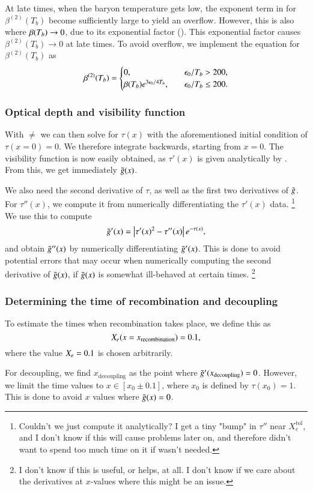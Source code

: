 At late times, when the baryon temperature gets low, the exponent term in  for $\beta^{(2)}(T_b)$ become sufficiently large to yield an overflow. However, this is also where $\beta(T_b)\to0$, due to its exponential factor (). This exponential factor causes $\beta^{(2)}(T_b)\to0$ at late times. To avoid overflow, we implement the equation for $\beta^{(2)}(T_b)$ as 
\begin{equation}
    \beta^{(2)}(T_b) = \begin{cases}
        0,\quad &\epsilon_0/T_b > 200, \\
        \beta(T_b) e^{3\epsilon_0/4T_b},\quad &\epsilon_0/T_b \leq 200.
    \end{cases}
\end{equation} 
 

\subsubsection{Optical depth and visibility function} \label{sssec:M2:implementations:optical_depth}
With $\ne$ we can then solve  for $\tau(x)$ with the aforementioned initial condition of $\tau(x=0)=0$. We therefore integrate backwards, starting from $x=0$. The visibility function is now easily obtained, as $\tau'(x)$ is given analytically by . From this, we get immediately $\tilde{g}(x)$. 

We also need the second derivative of $\tau$, as well as the first two derivatives of $\tilde{g}$. For $\tau''(x)$, we compute it from numerically differentiating the $\tau'(x)$ data. \footnote{Couldn't we just compute it analytically? I get a tiny "bump" in $\tau''$ near $X_e^\mathrm{tol}$, and I don't know if this will cause problems later on, and therefore didn't want to spend too much time on it if wasn't needed.} We use this to compute 
\begin{equation} \label{eq:M2:implementations:dg_dx}
    \tilde{g}'(x) = \left| \tau'(x)^2 - \tau''(x) \right| e^{-\tau(x)}, 
\end{equation}
and obtain $\tilde{g}''(x)$ by numerically differentiating $\tilde{g}'(x)$. This is done to avoid potential errors that may occur when numerically computing the second derivative of $\tilde{g}(x)$, if $\tilde{g}(x)$ is somewhat ill-behaved at certain times. \footnote{I don't know if this is useful, or helps, at all. I don't know if we care about the derivatives at $x$-values where this might be an issue.} 

\subsubsection{Determining the time of recombination and decoupling} \label{sssec:M2:implementations:determining_the_time_of_recombination_and_decoupling}
To estimate the times when recombination takes place, we define this as 
\begin{equation}
    X_e(x=x_\mathrm{recombination}) = 0.1,  
\end{equation}
where the value $X_e=0.1$ is chosen arbitrarily. 

For decoupling, we find $x_\mathrm{decoupling}$ as the point where $\tilde{g}'(x_\mathrm{decoupling})=0$. However, we limit the time values to $x\in[x_0\pm0.1]$, where $x_0$ is defined by $\tau(x_0)=1$. This is done to avoid $x$ values where $\tilde{g}(x)=0$. 